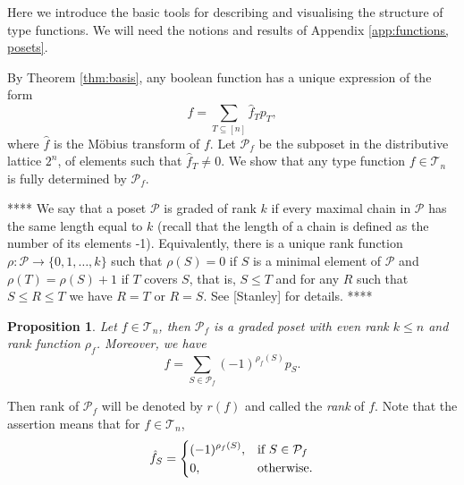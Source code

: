 \documentclass[12pt]{article}
\newtheorem{prop}{Proposition}
\theoremstyle{definition}
\theoremstyle{remark}
\def\Te{\mathcal T}
\def\Pe{\mathcal P}
\begin{document}
Here we introduce the basic tools for describing and visualising the structure of type
functions. We will need the notions and results of Appendix \ref{app:functions, posets}.


By Theorem \ref{thm:basis}, any boolean function has a unique expression of the form
\[
f=\sum_{T\subseteq [n]} \hat f_Tp_T,
\]
where $\hat f$ is the M\"obius transform of $f$. Let $\mathcal P_f$ be the subposet in the
distributive lattice $2^n$,  of elements such that
$\hat f_T\ne 0$. We show that any type function $f\in \Te_n$ is fully determined by $\Pe_f$.  




****
 We say that a poset $\Pe$  is graded of rank
$k$ if every maximal chain in $\Pe$ has the same length equal to $k$ (recall that the length
of a chain is defined as the number of its elements -1). Equivalently,  there is
a unique rank function $\rho: \Pe\to \{0,1,\dots,k\}$ such that $\rho(S)=0$ if $S$ is a
minimal element of $\Pe$ and $\rho(T)=\rho(S)+1$ if $T$ covers $S$, that is, $S\le T$ and for any $R$ such that
$S\le R\le T$ we have $R=T$ or $R=S$. See [Stanley] for details.
****

\begin{prop}\label{prop:graded} Let $f\in \Te_n$, then $\mathcal P_f$ is a graded poset
with even rank $k\le n$ and rank function $\rho_f$. Moreover, we have
\[
f=\sum_{S\in \mathcal P_f}(-1)^{\rho_f(S)}p_S.
\]


\end{prop}

Then rank of $\Pe_f$ will be denoted by $r(f)$ and called the {\em rank} of $f$. Note that the
assertion means that for $f\in \Te_n$, 
\[
\hat f_S=\begin{dcases} (-1)^{\rho_f(S)},& \text{if } S\in \Pe_f\\
0, & \text{otherwise}.
\end{dcases}
\]
\end{document}
